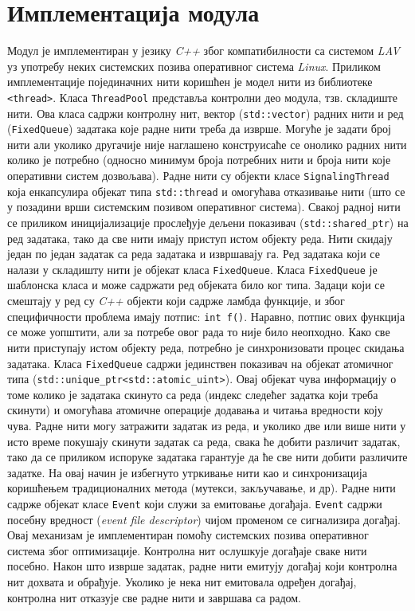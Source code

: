 \documentclass[12pt,oneside]{memoir}
\begin{document}
\section{Имплементација модула}
Модул је имплементиран у језику \textit{C++} због компатибилности са системом \textit{LAV} уз употребу неких системских позива оперативног система \textit{Linux}. Приликом имплементације појединачних нити коришћен је модел нити из библиотеке \texttt{<thread>}.
Класа \texttt{ThreadPool} представља контролни део модула, тзв. складиште нити. Ова класа садржи контролну нит, вектор (\texttt{std::vector}) радних нити и ред (\texttt{FixedQueue}) задатака које радне нити треба да изврше. Могуће је задати број нити али уколико другачије није наглашено конструисаће се онолико радних нити колико је потребно (односно минимум броја потребних нити и броја нити које оперативни систем дозвољава). Радне нити су објекти класе \texttt{SignalingThread} која енкапсулира објекат типа \texttt{std::thread} и омогућава отказивање нити (што се у позадини врши системским позивом оперативног система). Свакој радној нити се приликом иницијализације прослеђује дељени показивач (\texttt{std::shared\_ptr}) на ред задатака, тако да све нити имају приступ истом објекту реда. Нити скидају један по један задатак са реда задатака и извршавају га. Ред задатака који се налази у складишту нити је објекат класа \texttt{FixedQueue}. Класа \texttt{FixedQueue} је шаблонска класа и може садржати ред објеката било ког типа. Задаци који се смештају у ред су \textit{C++} објекти који садрже ламбда функције, и због специфичности проблема имају потпис: \texttt{int f()}. Наравно, потпис ових функција се може уопштити, али за потребе овог рада то није било неопходно. Како све нити приступају истом објекту реда, потребно је синхронизовати процес скидања задатака. Класа \texttt{FixedQueue} садржи јединствен показивач на објекат атомичног типа (\texttt{std::unique\_ptr<std::atomic\_uint>}). Овај објекат чува информацију о томе колико је задатака скинуто са реда (индекс следећег задатка који треба скинути) и омогућава атомичне операције додавања и читања вредности коју чува. Радне нити могу затражити задатак из реда, и уколико две или више нити у исто време покушају скинути задатак са реда, свака ће добити различит задатак, тако да се приликом испоруке задатака гарантује да ће све нити добити различите задатке.  На овај начин је избегнуто утркивање нити као и синхронизација коришћењем традиционалних метода (мутекси, закључавање, и др). Радне нити садрже објекат класе \texttt{Event} који служи за емитовање догађаја. \texttt{Event} садржи посебну вредност (\textit{event file descriptor}) чијом променом се сигнализира догађај. Овај механизам је имплементиран помоћу системских позива оперативног система због  оптимизације. Контролна нит ослушкује догађаје сваке нити посебно. Након што изврше задатак, радне нити емитују догађај који контролна нит дохвата и обрађује. Уколико је нека нит емитовала одређен догађај, контролна нит отказује све радне нити и завршава са радом.
\end{document}
